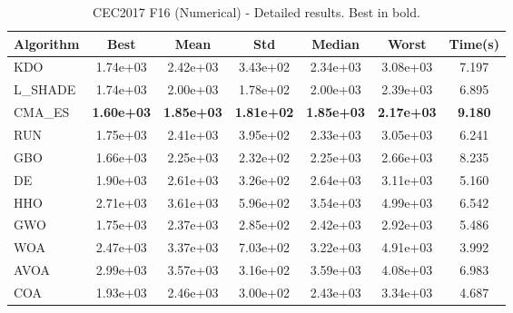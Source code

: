 \begin{table}[H]
\centering\small
\caption{CEC2017 F16 (Numerical) - Detailed results. Best in bold.}
\label{tab:cec2017_F16}
\begin{tabular}{lcccccc}
\toprule
\textbf{Algorithm} & \textbf{Best} & \textbf{Mean} & \textbf{Std} & \textbf{Median} & \textbf{Worst} & \textbf{Time(s)} \\
\midrule
KDO & 1.74e+03 & 2.42e+03 & 3.43e+02 & 2.34e+03 & 3.08e+03 & 7.197 \\
L_SHADE & 1.74e+03 & 2.00e+03 & 1.78e+02 & 2.00e+03 & 2.39e+03 & 6.895 \\
CMA_ES & \textbf{1.60e+03} & \textbf{1.85e+03} & \textbf{1.81e+02} & \textbf{1.85e+03} & \textbf{2.17e+03} & \textbf{9.180} \\
RUN & 1.75e+03 & 2.41e+03 & 3.95e+02 & 2.33e+03 & 3.05e+03 & 6.241 \\
GBO & 1.66e+03 & 2.25e+03 & 2.32e+02 & 2.25e+03 & 2.66e+03 & 8.235 \\
DE & 1.90e+03 & 2.61e+03 & 3.26e+02 & 2.64e+03 & 3.11e+03 & 5.160 \\
HHO & 2.71e+03 & 3.61e+03 & 5.96e+02 & 3.54e+03 & 4.99e+03 & 6.542 \\
GWO & 1.75e+03 & 2.37e+03 & 2.85e+02 & 2.42e+03 & 2.92e+03 & 5.486 \\
WOA & 2.47e+03 & 3.37e+03 & 7.03e+02 & 3.22e+03 & 4.91e+03 & 3.992 \\
AVOA & 2.99e+03 & 3.57e+03 & 3.16e+02 & 3.59e+03 & 4.08e+03 & 6.983 \\
COA & 1.93e+03 & 2.46e+03 & 3.00e+02 & 2.43e+03 & 3.34e+03 & 4.687 \\
\bottomrule
\end{tabular}
\end{table}

